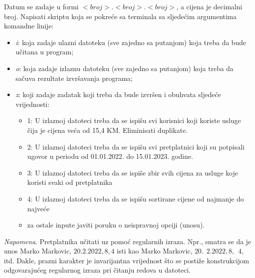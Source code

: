 \begin{enumerate}
   Datum se zadaje u formi $<broj>.<broj>.<broj>$, a cijena je decimalni broj. Napisati 
   skriptu koja se pokreće sa terminala sa sljedećim argumentima komandne linije:
   \begin{itemize}
   	\item \textit{i}: koja zadaje ulazni datoteku (sve zajedno sa putanjom) koja treba da bude učitana
   u program;
   \item \textit{o}: koja zadaje izlaznu datoteku (sve zajedno sa putanjom) koja treba da sačuva
   rezultate izvršavanja programa;
    \item \textit{z}: koji zadaje zadatak koji treba da bude izvršen i obuhvata sljedeće vrijednosti:
    \begin{itemize}
    	\item  1: U izlaznoj datoteci treba da se ispišu svi korisnici koji koriste usluge čija je  cijena veća od 15,4 KM. Eliminisati duplikate. 
        \item 2: U izlaznoj datoteci treba da se ispišu svi pretplatnici koji su potpisali ugovor u periodu od 01.01.2022. do 15.01.2023. godine.
        \item  3: U izlaznoj datoteci treba da se ispiše zbir svih cijena za usluge koje koristi svaki od pretplatnika
        \item 4: U izlaznoj datoteci treba da se ispišu sortirane cijene od najmanje do  najveće
        \item za ostale inpute javiti poruku o neispravnoj opciji  (unosu).
         \end{itemize}
   \end{itemize}
   \textit{Napomena}. Pretplatnika učitati uz pomoć regularnih izraza. Npr., smatra se da je unos Marko
   Markovic, $20.2.2022, 8,4$ isti kao Marko Markovic, $20.\ \ 2.2022, 8,\ \ 4$, itd. Dakle, prazni
   karakter je invarijantna vrijednost što se postiže konstrukcijom odgovarajućeg regularnog izraza
   pri čitanju redova u datoteci.
\end{enumerate}